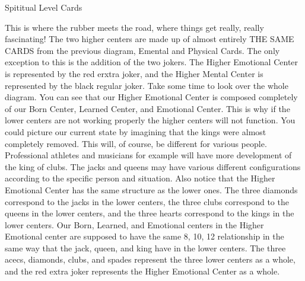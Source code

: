\documentclass[12pt,letterpaper]{book}
\begin{document}
Spititual Level Cards

This is where the rubber meets the road, where things get really, really fascinating! The two higher centers are made up of almost entirely THE SAME CARDS from the previous diagram, Emental and Physical Cards. The only exception to this is the addition of the two jokers. The Higher Emotional Center is represented by the red erxtra joker, and the Higher Mental Center is represented by the black regular joker. Take some time to look over the whole diagram. You can see that our Higher Emotional Center is composed completely of our Born Center, Learned Center, and Emotional Center. This is why if the lower centers are not working properly the higher centers will not function. You could picture our current state by imagining that the kings were almost completely removed. This will, of course, be different for various people. Professional athletes and musicians for example will have more development of the king of clubs. The jacks and queens may have various different configurations according to the specific person and situation.
Also notice that the Higher Emotional Center has the same structure as the lower ones. The three diamonds correspond to the jacks in the lower centers, the three clubs correspond to the queens in the lower centers, and the three hearts correspond to the kings in the lower centers. Our Born, Learned, and Emotional centers in the Higher Emotional center are supposed to have the same 8, 10, 12 relationship in the same way that the jack, queen, and king have in the lower centers. The three acecs, diamonds, clubs, and spades represent the three lower centers as a whole, and the red extra joker represents the Higher Emotional Center as a whole.
\end{document}

